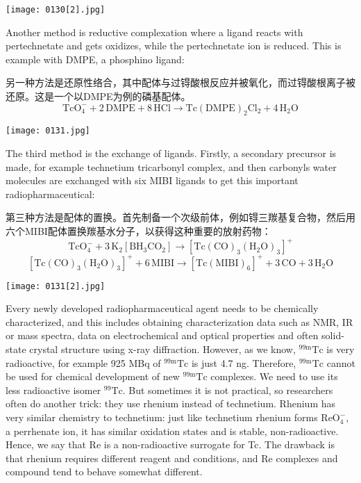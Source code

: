 \documentclass[dvipsnames, svgnames,a4paper,11pt]{article}
\begin{document}
\begin{figure*}[h]
	\centering
    \texttt{[image: 0130[2].jpg]}    
\end{figure*}

Another method is reductive complexation where a ligand reacts with pertechnetate
and gets oxidizes, while the pertechnetate ion is reduced. This is example with
DMPE, a phosphino ligand:

另一种方法是还原性络合，其中配体与过锝酸根反应并被氧化，而过锝酸根离子被还原。这是一个以DMPE为例的磷基配体。
\[
\mathrm{TcO_4^-} + 2 \, \mathrm{DMPE} + 8 \, \mathrm{HCl} \rightarrow \mathrm{Tc(DMPE)_2Cl_2} + 4 \, \mathrm{H_2O}
\]

\begin{figure*}[h]
	\centering
    \texttt{[image: 0131.jpg]}    
\end{figure*}

The third method is the exchange of ligands. Firstly, a secondary precursor is made,
for example technetium tricarbonyl complex, and then carbonyls water molecules are
exchanged with six MIBI ligands to get this important radiopharmaceutical:

第三种方法是配体的置换。首先制备一个次级前体，例如锝三羰基复合物，然后用六个MIBI配体置换羰基水分子，以获得这种重要的放射药物：
\[
\mathrm{TcO_4^-} + 3 \, \mathrm{K_2[BH_3CO_2]} \rightarrow [\mathrm{Tc(CO)_3(H_2O)_3}]^+
\]
\[
[\mathrm{Tc(CO)_3(H_2O)_3}]^+ + 6 \, \mathrm{MIBI} \rightarrow [\mathrm{Tc(MIBI)_6}]^+ + 3 \, \mathrm{CO} + 3 \, \mathrm{H_2O}
\]

\begin{figure*}[h]
	\centering
    \texttt{[image: 0131[2].jpg]}    
\end{figure*}

Every newly developed radiopharmaceutical agent needs to be chemically
characterized, and this includes obtaining characterization data such as NMR, IR or
mass spectra, data on electrochemical and optical properties and often solid-state
crystal structure using x-ray diffraction. However, as we know, ${}^\mathrm{99m}\mathrm{Tc}$ is very
radioactive, for example 925 MBq of ${}^\mathrm{99m}\mathrm{Tc}$ is just 4.7 ng. Therefore, ${}^\mathrm{99m}\mathrm{Tc}$ cannot be
used for chemical development of new ${}^\mathrm{99m}\mathrm{Tc}$ complexes. We need to use its less
radioactive isomer $\mathrm{{}^{99}Tc}$. But sometimes it is not practical, so researchers often do
another trick: they use rhenium instead of technetium. Rhenium has very similar
chemistry to technetium: just like technetium rhenium forms $\mathrm{ReO_4^-}$, a perrhenate ion,
it has similar oxidation states and is stable, non-radioactive. Hence, we say that Re
is a non-radioactive surrogate for Tc. The drawback is that rhenium requires different
reagent and conditions, and Re complexes and compound tend to behave somewhat
different.
\end{document}
